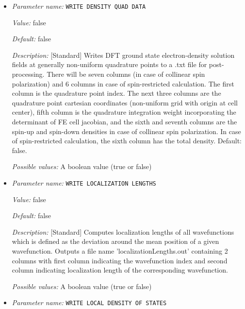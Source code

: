 \begin{itemize}
{\it Possible values:} A boolean value (true or false)
\item {\it Parameter name:} {\tt WRITE DENSITY QUAD DATA}
\label{parameters:Post_2dprocessing Options/WRITE DENSITY QUAD DATA}
\label{parameters:Post_2dprocessing_20Options/WRITE_20DENSITY_20QUAD_20DATA}


{\it Value:} false


{\it Default:} false

{\it Description:} [Standard] Writes DFT ground state electron-density solution fields at generally non-uniform quadrature points to a .txt file for post-processing. There will be seven columns (in case of collinear spin polarization) and 6 columns in case of spin-restricted calculation. The first column is the quadrature point index. The next three columns are the quadrature point cartesian coordinates (non-uniform grid with origin at cell center), fifth column is the quadrature integration weight incorporating the determinant of FE cell jacobian, and the sixth and seventh columns are the spin-up and spin-down densities in case of collinear spin polarization. In case of spin-restricted calculation, the sixth column has the total density. Default: false.


{\it Possible values:} A boolean value (true or false)
\item {\it Parameter name:} {\tt WRITE LOCALIZATION LENGTHS}
\label{parameters:Post_2dprocessing Options/WRITE LOCALIZATION LENGTHS}
\label{parameters:Post_2dprocessing_20Options/WRITE_20LOCALIZATION_20LENGTHS}


{\it Value:} false


{\it Default:} false


{\it Description:} [Standard] Computes localization lengths of all wavefunctions which is defined as the deviation around the mean position of a given wavefunction. Outputs a file name 'localizationLengths.out' containing 2 columns with first column indicating the wavefunction index and second column indicating localization length of the corresponding wavefunction.


{\it Possible values:} A boolean value (true or false)
\item {\it Parameter name:} {\tt WRITE LOCAL DENSITY OF STATES}
\label{parameters:Post_2dprocessing Options/WRITE LOCAL DENSITY OF STATES}
\label{parameters:Post_2dprocessing_20Options/WRITE_20LOCAL_20DENSITY_20OF_20STATES}



\end{itemize}
